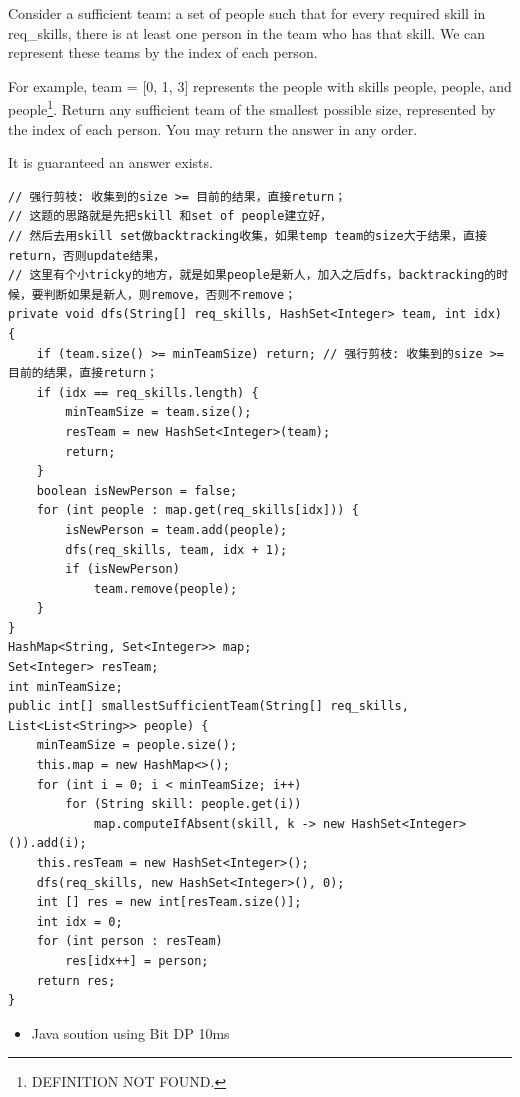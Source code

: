 \documentclass[9pt, b5paaper]{book}
\begin{document}
Consider a sufficient team: a set of people such that for every required skill in req\_skills, there is at least one person in the team who has that skill. We can represent these teams by the index of each person.

For example, team = [0, 1, 3] represents the people with skills people\footnotemark[1]{}, people\footnotemark[2]{}, and people\footnote{DEFINITION NOT FOUND.}.
Return any sufficient team of the smallest possible size, represented by the index of each person. You may return the answer in any order.

It is guaranteed an answer exists.
\begin{verbatim}
// 强行剪枝: 收集到的size >= 目前的结果，直接return；
// 这题的思路就是先把skill 和set of people建立好，
// 然后去用skill set做backtracking收集，如果temp team的size大于结果，直接return，否则update结果，
// 这里有个小tricky的地方，就是如果people是新人，加入之后dfs，backtracking的时候，要判断如果是新人，则remove，否则不remove；
private void dfs(String[] req_skills, HashSet<Integer> team, int idx) {
    if (team.size() >= minTeamSize) return; // 强行剪枝: 收集到的size >= 目前的结果，直接return；
    if (idx == req_skills.length) {
        minTeamSize = team.size();
        resTeam = new HashSet<Integer>(team);
        return;
    }
    boolean isNewPerson = false;
    for (int people : map.get(req_skills[idx])) {
        isNewPerson = team.add(people);
        dfs(req_skills, team, idx + 1);
        if (isNewPerson)
            team.remove(people);
    }
}
HashMap<String, Set<Integer>> map;
Set<Integer> resTeam; 
int minTeamSize;
public int[] smallestSufficientTeam(String[] req_skills, List<List<String>> people) {
    minTeamSize = people.size();
    this.map = new HashMap<>(); 
    for (int i = 0; i < minTeamSize; i++) 
        for (String skill: people.get(i)) 
            map.computeIfAbsent(skill, k -> new HashSet<Integer>()).add(i);
    this.resTeam = new HashSet<Integer>();
    dfs(req_skills, new HashSet<Integer>(), 0);
    int [] res = new int[resTeam.size()];     
    int idx = 0;
    for (int person : resTeam) 
        res[idx++] = person;
    return res;
}
\end{verbatim}
\begin{itemize}
\item Java soution using Bit DP 10ms
\end{itemize}
\end{document}

